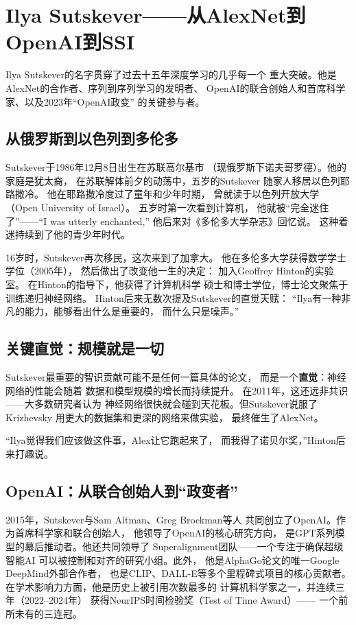 \section{Ilya Sutskever——从AlexNet到OpenAI到SSI}
\label{sec:sutskever}

Ilya Sutskever的名字贯穿了过去十五年深度学习的几乎每一个
重大突破。他是AlexNet的合作者、序列到序列学习的发明者、
OpenAI的联合创始人和首席科学家、以及2023年``OpenAI政变''
的关键参与者。

\subsection{从俄罗斯到以色列到多伦多}

Sutskever于1986年12月8日出生在苏联高尔基市
（现俄罗斯下诺夫哥罗德）。他的家庭是犹太裔，
在苏联解体前夕的动荡中，五岁的Sutskever
随家人移居以色列耶路撒冷。
他在耶路撒冷度过了童年和少年时期，
曾就读于以色列开放大学（Open University of Israel）。
五岁时第一次看到计算机，
他就被``完全迷住了''——``I was utterly enchanted,''
他后来对《多伦多大学杂志》回忆说。
这种着迷持续到了他的青少年时代。

16岁时，Sutskever再次移民，这次来到了加拿大。
他在多伦多大学获得数学学士学位（2005年），
然后做出了改变他一生的决定：
加入Geoffrey Hinton的实验室。
在Hinton的指导下，他获得了计算机科学
硕士和博士学位，博士论文聚焦于训练递归神经网络。
Hinton后来无数次提及Sutskever的直觉天赋：
``Ilya有一种非凡的能力，能够看出什么是重要的，
而什么只是噪声。''

\subsection{关键直觉：规模就是一切}

Sutskever最重要的智识贡献可能不是任何一篇具体的论文，
而是一个\textbf{直觉}：神经网络的性能会随着
数据和模型规模的增长而持续提升。
在2011年，这还远非共识——大多数研究者认为
神经网络很快就会碰到天花板。但Sutskever说服了Krizhevsky
用更大的数据集和更深的网络来做实验，
最终催生了AlexNet。

``Ilya觉得我们应该做这件事，Alex让它跑起来了，
而我得了诺贝尔奖，''Hinton后来打趣说。

\subsection{OpenAI：从联合创始人到``政变者''}

2015年，Sutskever与Sam Altman、Greg Brockman等人
共同创立了OpenAI。作为首席科学家和联合创始人，
他领导了OpenAI的核心研究方向，
是GPT系列模型的幕后推动者。他还共同领导了
Superalignment团队——一个专注于确保超级智能AI
可以被控制和对齐的研究小组。此外，
他是AlphaGo论文的唯一Google DeepMind外部合作者，
也是CLIP、DALL-E等多个里程碑式项目的核心贡献者。
在学术影响力方面，他是历史上被引用次数最多的
计算机科学家之一，并连续三年（2022--2024年）
获得NeurIPS时间检验奖（Test of Time Award）——
一个前所未有的三连冠。

